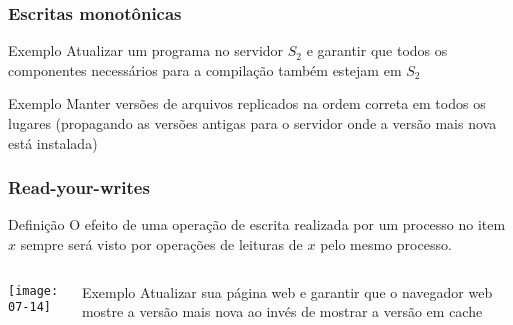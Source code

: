 \documentclass[Ligatures=TeX,table,brazil,svgnames,usetotalslideindicator,compress,10pt]{beamer}
\begin{document}
\begin{frame}
  \frametitle{Escritas monotônicas}

  \begin{exampleblock}{Exemplo}
    Atualizar um programa no servidor $S_2$ e garantir que todos os componentes necessários para a compilação também estejam em $S_2$
  \end{exampleblock}

  \pause
  \begin{exampleblock}{Exemplo}
    Manter versões de arquivos replicados na ordem correta em todos os lugares (propagando as versões antigas para o servidor onde a versão mais nova está instalada)
  \end{exampleblock}

\end{frame}

\begin{frame}
  \frametitle{Read-your-writes}

  \begin{block}{Definição}
    O efeito de uma operação de escrita realizada por um processo no item $x$ sempre será visto por operações de leituras de $x$ pelo mesmo processo.
  \end{block}

  \qquad

  \begin{columns}
    \begin{column}{0.6\textwidth}
      \texttt{[image: 07-14]}
    \end{column}

    \begin{column}{0.4\textwidth}

      \pause
      \begin{exampleblock}{Exemplo}
        Atualizar sua página web e garantir que o navegador web mostre a versão mais nova ao invés de mostrar a versão em cache
      \end{exampleblock}

    \end{column}

  \end{columns}

\end{frame}
\end{document}
